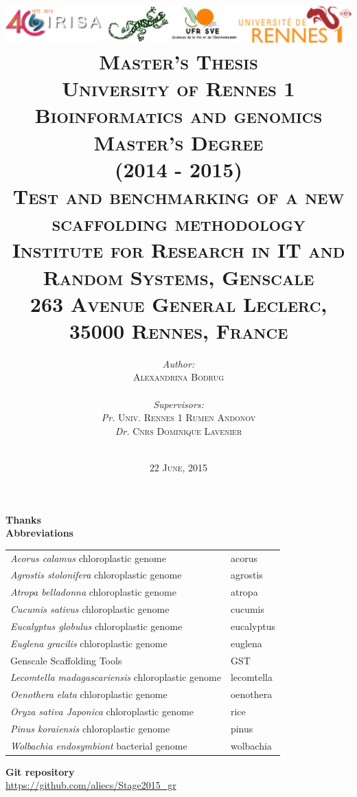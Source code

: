 \documentclass[12pt]{article}
\title{\includegraphics[scale=0.1]{logos} \vspace*{3\baselineskip}\\
        \large \textbf{\textsc{Master's Thesis}} \\
        \normalsize \textsc{University of Rennes 1} \\
        \normalsize \textsc{Bioinformatics and genomics Master's Degree} \\
        \normalsize \textsc{(2014 - 2015)} \vspace*{2\baselineskip} \\
		\large \textbf{\textsc{Test and benchmarking of a new scaffolding methodology}} \vspace*{0.5\baselineskip}\\
		\footnotesize \textsc{Institute for Research in IT and Random Systems, Genscale \\
		263 Avenue General Leclerc, 35000 Rennes, France}
        }
\author{\normalsize
	\begin{minipage}{0.4\textwidth}
	\begin{flushleft} 
	\emph{Author:}\\
	\textsc{Alexandrina Bodrug}
	\end{flushleft}
	\end{minipage}
	~
	\begin{minipage}{0.4\textwidth}
	\begin{flushright}
	\emph{Supervisors:} \\
	\textit{Pr.} \textsc{Univ. Rennes 1 Rumen Andonov} \\
	\textit{Dr.} \textsc{Cnrs Dominique Lavenier}
	\end{flushright}
	\end{minipage}\\[2cm]}
\date{\small \textsc{22 June, 2015}}
\begin{document}
\maketitle
\thispagestyle{empty}
\clearpage
\onecolumn
\textbf{Thanks} \\
\thispagestyle{empty}
\clearpage
\onecolumn
\textbf{Abbreviations} \\

\begin{tabular}{ l | l }

\textit{Acorus calamus} chloroplastic genome & acorus \\
\textit{Agrostis stolonifera} chloroplastic genome & agrostis \\
\textit{Atropa belladonna} chloroplastic genome & atropa \\
\textit{Cucumis sativus} chloroplastic genome & cucumis \\    
\textit{Eucalyptus globulus} chloroplastic genome & eucalyptus \\ 
\textit{Euglena gracilis} chloroplastic genome & euglena \\ 
Genscale Scaffolding Tools & GST \\
\textit{Lecomtella madagascariensis} chloroplastic genome & lecomtella \\  
\textit{Oenothera elata} chloroplastic genome & oenothera \\  
\textit{Oryza sativa Japonica} chloroplastic genome & rice \\ 
\textit{Pinus koraiensis} chloroplastic genome & pinus \\   
\textit{Wolbachia endosymbiont} bacterial genome & wolbachia \\ 

\end{tabular}


\vspace{2cm}
\textbf{Git repository} \\
\hspace*{1cm} \url{https://github.com/aliecs/Stage2015_gr}
\end{document}
